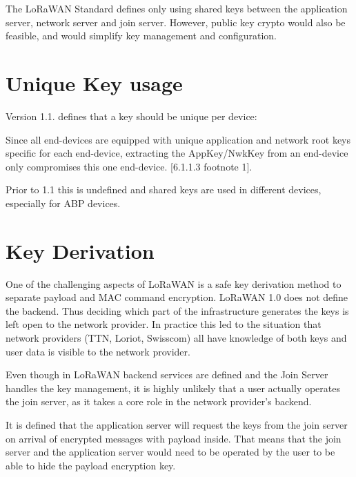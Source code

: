{The LoRaWAN Standard defines only using shared keys between the
application server, network server and join server. However, public key
crypto would also be feasible, and would simplify key management and configuration. %

\hypertarget{h.rxbla8bfpdr7}{\section{\texorpdfstring{{Unique Key
usage}}{Unique Key usage}}\label{h.rxbla8bfpdr7}}

{Version 1.1. defines that a key should be unique per device: }

\begin{displayquote}
Since all end-devices are equipped with unique application and
network root keys specific for each end-device, extracting the
AppKey/NwkKey from an end-device only compromises this one end-device.
[6.1.1.3 footnote 1].
\end{displayquote}

{Prior to 1.1 this is undefined and shared keys are used in
different devices, especially for ABP devices.}

\hypertarget{h.ukt1jzew31xa}{\section{\texorpdfstring{{Key
Derivation}}{Key Derivation}}\label{h.ukt1jzew31xa}}

{One of the challenging aspects of LoRaWAN is a safe key derivation
method to separate payload and MAC command encryption. LoRaWAN 1.0 does
not define the backend. Thus deciding which part of the infrastructure generates the keys is left open to the network provider. In practice this
led to the situation that network providers (TTN, Loriot, Swisscom) all
have knowledge of both keys and user data is visible to the network
provider.}

{Even though in LoRaWAN backend services are defined and the Join Server
handles the key management, it is highly unlikely that a user actually
operates the join server, as it takes a core role in the network
provider's backend. }

{It is defined that the application server will request the keys from
the join server on arrival of encrypted messages with payload inside.
That means that the join server and the application server would need to
be operated by the user to be able to hide the payload encryption key.}

}
